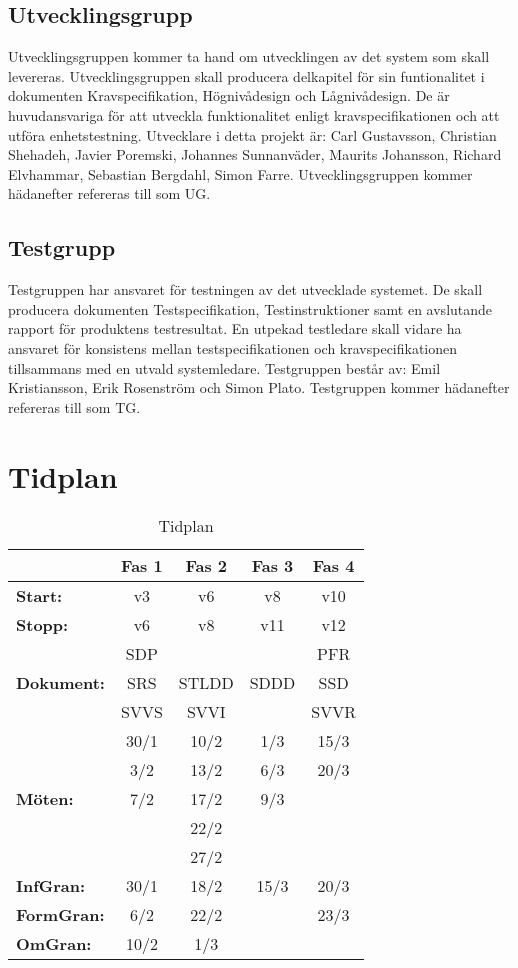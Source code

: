\documentclass[paper=a4, fontsize=11pt,twoside]{article}
\begin{document}
\subsection*{Utvecklingsgrupp}
Utvecklingsgruppen kommer ta hand om utvecklingen av det system som skall levereras. Utvecklingsgruppen skall producera delkapitel för sin funtionalitet i dokumenten Kravspecifikation, Högnivådesign och Lågnivådesign. De är huvudansvariga för att utveckla funktionalitet enligt kravspecifikationen och att utföra enhetstestning. Utvecklare i detta projekt är: Carl Gustavsson, Christian Shehadeh, Javier Poremski, Johannes Sunnanväder, Maurits Johansson, Richard Elvhammar, Sebastian Bergdahl, Simon Farre.
Utvecklingsgruppen kommer hädanefter refereras till som UG.

\subsection*{Testgrupp}
Testgruppen har ansvaret för testningen av det utvecklade systemet. De skall producera dokumenten Testspecifikation, Testinstruktioner samt en avslutande rapport för produktens testresultat. En utpekad testledare skall vidare ha ansvaret för konsistens mellan testspecifikationen och kravspecifikationen tillsammans med en utvald systemledare. Testgruppen består av: Emil Kristiansson, Erik Rosenström och Simon Plato.
Testgruppen kommer hädanefter refereras till som TG.

\section{Tidplan}
\begin{table}[H]
\centering
\begin{tabular}{| l | c | c | c | c |} %
\hline
 & \textbf{Fas 1} & \textbf{Fas 2} & \textbf{Fas 3} & \textbf{Fas 4}\\
\hline
\hline
\textbf{Start:} & v3 & v6 & v8 & v10 \\
\hline
\textbf{Stopp:} & v6 & v8 & v11 & v12 \\
\hline
 				& SDP & & & PFR \\
\textbf{Dokument:} & SRS & STLDD & SDDD & SSD \\
 				& SVVS & SVVI & & SVVR \\
\hline
			& 30/1 	& 10/2 & 1/3 	& 15/3\\
			& 3/2   	& 13/2 & 6/3 	& 20/3\\
\textbf{Möten:}	& 7/2 	& 17/2 & 9/3 	& \\
			& 		& 22/2 &		& \\
			& 		& 27/2 &		& \\
\hline
\textbf{InfGran:} & 30/1 & 18/2 & 15/3 & 20/3 \\
\hline
\textbf{FormGran:} & 6/2 & 22/2 &	 & 23/3 \\
\hline
\textbf{OmGran:} & 10/2 & 1/3 &		 & \\
\hline
\end{tabular}
{ \fontsize{6pt}{0.2cm}\selectfont \caption{Tidplan}}
\end{table}
\end{document}
